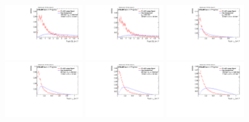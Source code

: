 \begin{figure}
\includegraphics[width=0.3\textwidth]{sascha_input/Appendix/Distributions/w/distributions/beta17/h_normal_tj_D2_17_bin5.pdf} \hspace{1mm}
\includegraphics[width=0.3\textwidth]{sascha_input/Appendix/Distributions/w/distributions/beta17/h_normal_tj_D2_17_bin6.pdf}
\bigskip
\includegraphics[width=0.3\textwidth]{sascha_input/Appendix/Distributions/w/distributions/beta17/h_normal_tj_nSub21_17_bin1.pdf} \hspace{1mm}
\includegraphics[width=0.3\textwidth]{sascha_input/Appendix/Distributions/w/distributions/beta17/h_normal_tj_nSub21_17_bin2.pdf} \hspace{1mm}
\includegraphics[width=0.3\textwidth]{sascha_input/Appendix/Distributions/w/distributions/beta17/h_normal_tj_nSub21_17_bin3.pdf} 
\bigskip
\includegraphics[width=0.3\textwidth]{sascha_input/Appendix/Distributions/w/distributions/beta17/h_normal_tj_nSub21_17_bin4.pdf} \hspace{6mm}

\end{figure}

